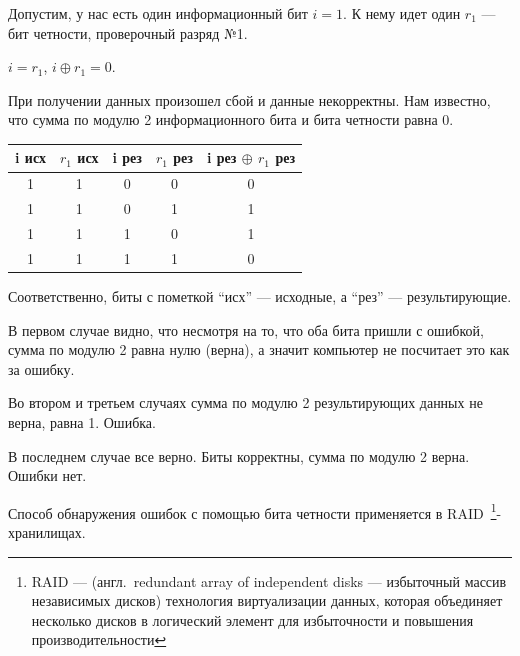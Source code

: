 Допустим, у нас есть один информационный бит $i = 1$. К нему идет один $r_1$ --- бит четности, проверочный разряд №1.

\noindent $i = r_1$, $i \oplus r_1 = 0$.

\noindent При получении данных произошел сбой и данные некорректны. Нам известно, что сумма по модулю 2 информационного бита и бита четности равна 0.

\begin{table}[H]
    \centering
    \begin{tabular}{|c|c|c|c|c|}
    \hline
    i исх & $r_{1}$ исх & i рез & $r_{1}$ рез & i рез $\oplus$ $r_{1}$ рез \\ \hline
    1 & 1 & 0 & 0 & 0 \\
    1 & 1 & 0 & 1 & 1 \\
    1 & 1 & 1 & 0 & 1 \\
    1 & 1 & 1 & 1 & 0 \\ \hline
    \end{tabular}
\end{table}

\noindent Соответственно, биты с пометкой \enquote{исх} --- исходные, а \enquote{рез} --- результирующие.

\noindent В первом случае видно, что несмотря на то, что оба бита пришли с ошибкой, сумма по модулю 2 равна нулю (верна), а значит компьютер не посчитает это как за ошибку.

\noindent Во втором и третьем случаях сумма по модулю 2 результирующих данных не верна, равна 1. Ошибка.

\noindent В последнем случае все верно. Биты корректны, сумма по модулю 2 верна. Ошибки нет.

\bigskip
Способ обнаружения ошибок с помощью бита четности применяется в RAID~\footnote{RAID --- (англ.\ redundant array of independent disks --- избыточный массив независимых дисков) технология виртуализации данных, которая объединяет несколько дисков в логический элемент для избыточности и повышения производительности}-хранилищах.
